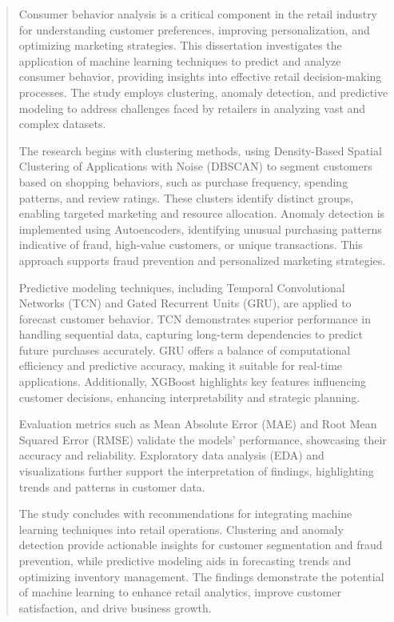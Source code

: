 \documentclass[12pt, a4paper,twoside]{report}
\theoremstyle{plain} %
\theoremstyle{definition} %
\theoremstyle{remark} %
\numberwithin{equation}{chapter}
\begin{document}
\begin{abstract}
    Consumer behavior analysis is a critical component in the retail industry for understanding customer preferences, improving personalization, and optimizing marketing strategies. This dissertation investigates the application of machine learning techniques to predict and analyze consumer behavior, providing insights into effective retail decision-making processes. The study employs clustering, anomaly detection, and predictive modeling to address challenges faced by retailers in analyzing vast and complex datasets.

The research begins with clustering methods, using Density-Based Spatial Clustering of Applications with Noise (DBSCAN) to segment customers based on shopping behaviors, such as purchase frequency, spending patterns, and review ratings. These clusters identify distinct groups, enabling targeted marketing and resource allocation. Anomaly detection is implemented using Autoencoders, identifying unusual purchasing patterns indicative of fraud, high-value customers, or unique transactions. This approach supports fraud prevention and personalized marketing strategies.

Predictive modeling techniques, including Temporal Convolutional Networks (TCN) and Gated Recurrent Units (GRU), are applied to forecast customer behavior. TCN demonstrates superior performance in handling sequential data, capturing long-term dependencies to predict future purchases accurately. GRU offers a balance of computational efficiency and predictive accuracy, making it suitable for real-time applications. Additionally, XGBoost highlights key features influencing customer decisions, enhancing interpretability and strategic planning.

Evaluation metrics such as Mean Absolute Error (MAE) and Root Mean Squared Error (RMSE) validate the models' performance, showcasing their accuracy and reliability. Exploratory data analysis (EDA) and visualizations further support the interpretation of findings, highlighting trends and patterns in customer data.

The study concludes with recommendations for integrating machine learning techniques into retail operations. Clustering and anomaly detection provide actionable insights for customer segmentation and fraud prevention, while predictive modeling aids in forecasting trends and optimizing inventory management. The findings demonstrate the potential of machine learning to enhance retail analytics, improve customer satisfaction, and drive business growth.


\end{abstract}
\end{document}
